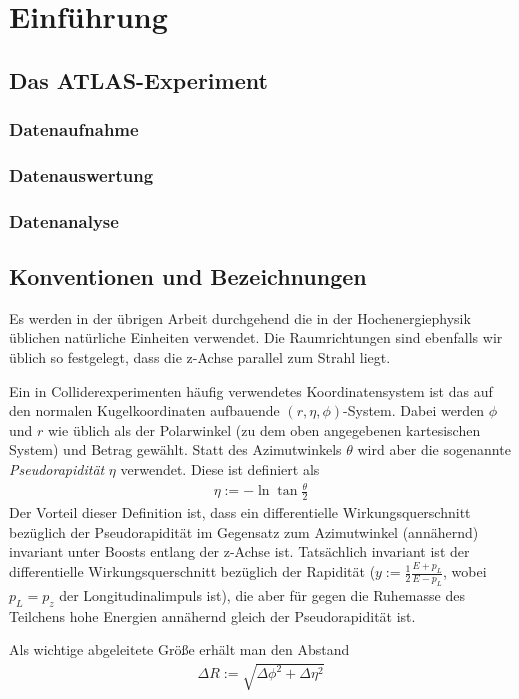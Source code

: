 \section{Einführung}
\subsection{Das ATLAS-Experiment}

\subsubsection{Datenaufnahme}
\subsubsection{Datenauswertung}
\subsubsection{Datenanalyse}

\subsection{Konventionen und Bezeichnungen}
Es werden in der übrigen Arbeit durchgehend die in der Hochenergiephysik
üblichen natürliche Einheiten verwendet. Die Raumrichtungen sind ebenfalls wir
üblich so festgelegt, dass die z-Achse parallel zum Strahl liegt.

Ein in Colliderexperimenten häufig verwendetes Koordinatensystem ist das auf den
normalen Kugelkoordinaten aufbauende $(r, \eta, \phi)$-System. Dabei werden
$\phi$ und $r$ wie üblich als der Polarwinkel (zu dem oben angegebenen
kartesischen System) und Betrag gewählt. Statt des Azimutwinkels $\theta$ wird
aber die sogenannte \emph{Pseudorapidität} $\eta$ verwendet. Diese ist definiert
als
\begin{align}
  \eta := -\ln{\tan{\frac \theta 2}}
\end{align}
Der Vorteil dieser Definition ist, dass ein differentielle Wirkungsquerschnitt
bezüglich der Pseudorapidität im Gegensatz zum Azimutwinkel (annähernd)
invariant unter Boosts entlang der z-Achse ist.  Tatsächlich invariant ist der
differentielle Wirkungsquerschnitt bezüglich der Rapidität ($y := \frac12
\frac{E + p_L}{E - p_L}$, wobei $p_L = p_z$ der Longitudinalimpuls ist), die
aber für gegen die Ruhemasse des Teilchens hohe Energien annähernd gleich der
Pseudorapidität ist.

Als wichtige abgeleitete Größe erhält man den Abstand
\begin{align}
  \Delta R := \sqrt{\Delta\phi^2 + \Delta\eta^2}
  \label{def:dr}
\end{align}
